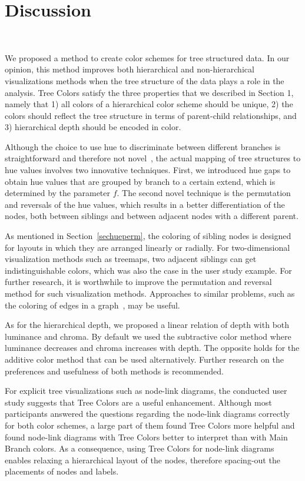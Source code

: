 \documentclass[journal]{vgtc}                %
\begin{document}
\section{Discussion}~\label{secdisc}

We proposed a method to create color schemes for tree structured data. In our opinion, this method improves both hierarchical and non-hierarchical visualizations methods when the tree structure of the data plays a role in the analysis. Tree Colors satisfy the three properties that we described in Section 1, namely that 1) all colors of a hierarchical color scheme should be unique, 2) the colors should reflect the tree structure in terms of parent-child relationships, and 3) hierarchical depth should be encoded in color. 

Although the choice to use hue to discriminate between different branches is straightforward and therefore not novel~\cite{yang2002, lam2012}, the actual mapping of tree structures to hue values involves two innovative techniques. First, we introduced hue gaps to obtain hue values that are grouped by branch to a certain extend, which is determined by the parameter $f$. The second novel technique is the permutation and reversals of the hue values, which results in a better differentiation of the nodes, both between siblings and between adjacent nodes with a different parent.

As mentioned in Section~\ref{sechueperm}, the coloring of sibling nodes is designed for layouts in which they are arranged linearly or radially. For two-dimensional visualization methods such as treemaps, two adjacent siblings can get indistinguishable colors, which was also the case in the user study example. For further research, it is worthwhile to improve the permutation and reversal method for such visualization methods. Approaches to similar problems, such as the coloring of edges in a graph~\cite{Jianu09}, may be useful.

As for the hierarchical depth, we proposed a linear relation of depth with both luminance and chroma. By default we used the subtractive color method where luminance decreases and chroma increases with depth. The opposite holds for the additive color method that can be used alternatively. Further research on the preferences and usefulness of both methods is recommended.


For explicit tree visualizations such as node-link diagrams, the conducted user study suggests that Tree Colors are 
a useful enhancement. Although most participants answered the questions regarding the node-link diagrams correctly for both color schemes, a large part of them found Tree Colors more helpful and found node-link diagrams with Tree Colors better to interpret than with Main Branch colors. As a consequence, using Tree Colors for node-link diagrams enables relaxing 
a hierarchical layout of the nodes, therefore spacing-out the placements of nodes and labels.
\end{document}

